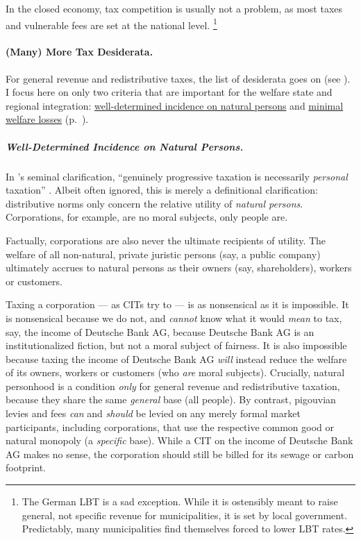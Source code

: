 In the closed economy, tax competition is usually not a problem, as most taxes and vulnerable fees are set at the national level.
\footnote{
	The German \gls{LBT} is a sad exception.
	While it is ostensibly meant to raise general, not specific revenue for municipalities, it is set by local government.
	Predictably, many municipalities find themselves forced to lower \gls{LBT} rates.
}

\paragraph[Tax Desiderata]{(Many) More Tax Desiderata.}
For general revenue and redistributive taxes, the list of desiderata goes on (see \citealt{Held2010a}).
I focus here on only two criteria that are important for the welfare state and regional integration:
\hyperref[sec:well-determined-incidence]{well-determined incidence on natural persons} and \hyperref[sec:minimal-DWL]{minimal welfare losses} (p.~\pageref{sec:minimal-DWL}).

\subparagraph[Incidence]{Well-Determined Incidence on Natural Persons.}
	\label{sec:well-determined-incidence}
In \citeauthor{Vickrey1947}'s seminal clarification, ``genuinely progressive taxation is necessarily \emph{personal} taxation'' \citeyearpar[1, emphasis added]{Vickrey1947}.
Albeit often ignored, this is merely a definitional clarification:
distributive norms only concern the relative utility of \emph{natural persons}.
Corporations, for example, are no moral subjects, only people are.

Factually, corporations are also never the ultimate recipients of utility.
The welfare of all non-natural, private juristic persons (say, a public company) ultimately accrues to natural persons as their owners (say, shareholders), workers or customers.

Taxing a corporation --- as \glspl{CIT} try to --- is as nonsensical as it is impossible.
It is nonsensical because we do not, and \emph{cannot} know what it would \emph{mean} to tax, say, the income of Deutsche Bank AG, because Deutsche Bank AG is an institutionalized fiction, but not a moral subject of fairness.
It is also impossible because taxing the income of Deutsche Bank AG \emph{will} instead reduce the welfare of its owners, workers or customers (who \emph{are} moral subjects).
Crucially, natural personhood is a condition \emph{only} for general revenue and redistributive taxation, because they share the same \emph{general} base (all people).
By contrast, pigouvian levies and fees \emph{can} and \emph{should} be levied on any merely formal market participants, including corporations, that use the respective common good or natural monopoly (a \emph{specific} base).
While a \gls{CIT} on the income of Deutsche Bank AG makes no sense, the corporation should still be billed for its sewage or carbon footprint.

